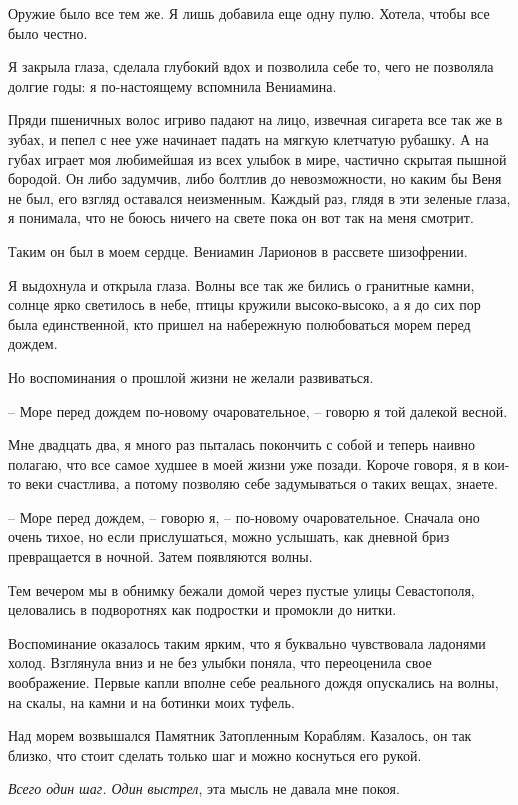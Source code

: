 \documentclass[
]{book}
\begin{document}
Оружие было все тем же. Я лишь добавила еще одну пулю. Хотела, чтобы все было честно.

Я закрыла глаза, сделала глубокий вдох и позволила себе то, чего не позволяла долгие годы: я по-настоящему вспомнила Вениамина.

Пряди пшеничных волос игриво падают на лицо, извечная сигарета все так же в зубах, и пепел с нее уже начинает падать на мягкую клетчатую рубашку. А на губах играет моя любимейшая из всех улыбок в мире, частично скрытая пышной бородой. Он либо задумчив, либо болтлив до невозможности, но каким бы Веня не был, его взгляд оставался неизменным. Каждый раз, глядя в эти зеленые глаза, я понимала, что не боюсь ничего на свете пока он вот так на меня смотрит.

Таким он был в моем сердце. Вениамин Ларионов в рассвете шизофрении.

Я выдохнула и открыла глаза. Волны все так же бились о гранитные камни, солнце ярко светилось в небе, птицы кружили высоко-высоко, а я до сих пор была единственной, кто пришел на набережную полюбоваться морем перед дождем.

Но воспоминания о прошлой жизни не желали развиваться.

-- Море перед дождем по-новому очаровательное, -- говорю я той далекой весной.

Мне двадцать два, я много раз пыталась покончить с собой и теперь наивно полагаю, что все самое худшее в моей жизни уже позади. Короче говоря, я в кои-то веки счастлива, а потому позволяю себе задумываться о таких вещах, знаете.

-- Море перед дождем, -- говорю я, -- по-новому очаровательное. Сначала оно очень тихое, но если прислушаться, можно услышать, как дневной бриз превращается в ночной. Затем появляются волны.

Тем вечером мы в обнимку бежали домой через пустые улицы Севастополя, целовались в подворотнях как подростки и промокли до нитки.

Воспоминание оказалось таким ярким, что я буквально чувствовала ладонями холод. Взглянула вниз и не без улыбки поняла, что переоценила свое воображение. Первые капли вполне себе реального дождя опускались на волны, на скалы, на камни и на ботинки моих туфель.

Над морем возвышался Памятник Затопленным Кораблям. Казалось, он так близко, что стоит сделать только шаг и можно коснуться его рукой.

\emph{Всего один шаг. Один выстрел}, эта мысль не давала мне покоя.
\end{document}
